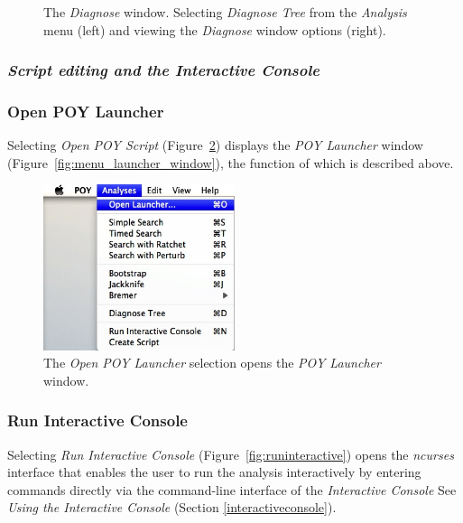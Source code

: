 {\begin{figure}
\begin{minipage}[c]{0.52\textwidth}
   	\end{minipage}
\caption{The \emph{Diagnose} window. Selecting \emph{Diagnose Tree} from the \emph{Analysis} menu (left) 
and viewing the \emph{Diagnose} window options (right).}
\label{fig:diagnosetree}
\end{figure}

\subsubsection{\emph{Script editing and the Interactive Console}}

\subsubsection*{Open POY Launcher}

Selecting \emph{Open POY Script} (Figure~\ref{fig:open_poy_launcher}) displays the \emph{POY Launcher} 
window (Figure~\ref{fig:menu_launcher_window}), the function of which is described above.

\begin{figure}[htpb]
    \begin{center}
        \includegraphics[width=0.5\textwidth]{doc/figures/openpoylauncher_menu.jpg}
    \end{center}
    \caption{The \emph{Open POY Launcher} selection opens the \emph{POY Launcher} window.}
    \label{fig:open_poy_launcher}
\end{figure}

\subsubsection*{Run Interactive Console}

Selecting \emph{Run Interactive Console} (Figure~\ref{fig:runinteractive}) opens the \emph{ncurses} interface
that enables the user to run the analysis interactively by entering \poy commands directly via the command-line 
interface of the \emph{Interactive Console} See \emph{Using the Interactive Console} (Section \ref{interactiveconsole}).

}
